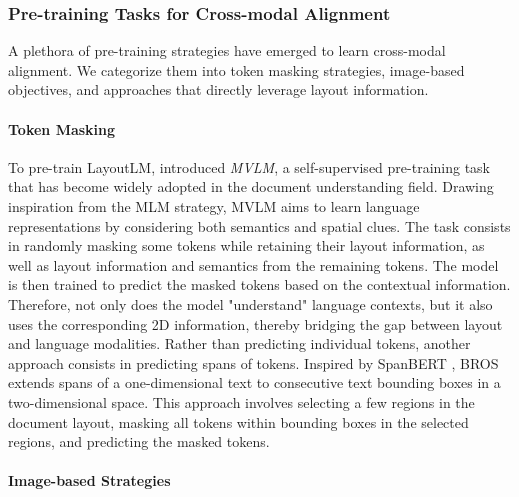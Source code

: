 \subsubsection{Pre-training Tasks for Cross-modal Alignment}

A plethora of pre-training strategies have emerged to learn cross-modal alignment. We categorize them into token masking strategies, image-based objectives, and approaches that directly leverage layout information.

\paragraph{Token Masking}

To pre-train LayoutLM, \citet{xu2020layoutlm} introduced \textit{\ac{MVLM}}, a self-supervised pre-training task that has become widely adopted in the document understanding field. Drawing inspiration from the \ac{MLM} strategy, \ac{MVLM} aims to learn language representations by considering both semantics and spatial clues. The task consists in randomly masking some tokens while retaining their layout information, as well as layout information and semantics from the remaining tokens. The model is then trained to predict the masked tokens based on the contextual information. Therefore, not only does the model "understand" language contexts, but it also uses the corresponding 2D information, thereby bridging the gap between layout and language modalities.
Rather than predicting individual tokens, another approach consists in predicting spans of tokens. Inspired by SpanBERT \citep{joshi2020spanbert}, BROS \citep{hong2020bros} extends spans of a one-dimensional text to consecutive text bounding boxes in a two-dimensional space. This approach involves selecting a few regions in the document layout, masking all tokens within bounding boxes in the selected regions, and predicting the masked tokens. 

\paragraph{Image-based Strategies}


